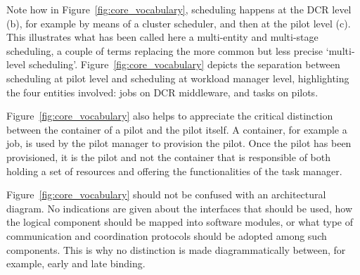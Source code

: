 \documentclass{sig-alternate}
\begin{document}

Note how in Figure~\ref{fig:core_vocabulary}, scheduling happens at the DCR
level (b), for example by means of a cluster scheduler, and then at the pilot
level (c). This illustrates what has been called here a multi-entity and
multi-stage scheduling, a couple of terms replacing the more common but less
precise `multi-level scheduling'.  Figure~\ref{fig:core_vocabulary} depicts the
separation between scheduling at pilot level and scheduling at workload manager
level, highlighting the four entities involved: jobs on DCR middleware, and
tasks on pilots.


Figure~\ref{fig:core_vocabulary} also helps to appreciate the critical
distinction between the container of a pilot and the pilot itself. A container,
for example a job, is used by the pilot manager to provision the pilot. Once the
pilot has been provisioned, it is the pilot and not the container that is
responsible of both holding a set of resources and offering the functionalities
of the task manager.


Figure~\ref{fig:core_vocabulary} should not be confused with an architectural
diagram. No indications are given about the interfaces that should be used, how
the logical component should be mapped into software modules, or what type of
communication and coordination protocols should be adopted among such
components. This is why no distinction is made diagrammatically between, for
example, early and late binding.

\end{document}
